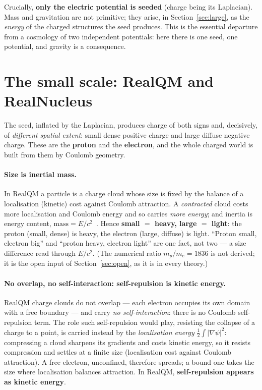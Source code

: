\documentclass[11pt]{article}
\newcommand{\grad}{\nabla}
\newcommand{\half}{\tfrac{1}{2}}
\begin{document}
Crucially, \textbf{only the electric potential is seeded} (charge being its Laplacian). Mass and gravitation are not primitive; they arise, in
Section~\ref{sec:large}, as the \emph{energy} of the charged structures the seed produces. This is the essential
departure from a cosmology of two independent potentials: here there is one seed, one potential, and gravity is a
consequence.

\section{The small scale: RealQM and RealNucleus}\label{sec:small}
The seed, inflated by the Laplacian, produces charge of both signs and, decisively, of \emph{different spatial extent}: small dense
positive charge and large diffuse negative charge. These are the \textbf{proton} and the \textbf{electron}, and
the whole charged world is built from them by Coulomb geometry.

\paragraph{Size is inertial mass.} In RealQM a particle is a charge cloud whose size is fixed by the balance of a
localisation (kinetic) cost against Coulomb attraction. A \emph{contracted} cloud costs more localisation and
Coulomb energy and so carries \emph{more energy}; and inertia is energy content, $\text{mass}=E/c^2$~\cite{nomass}.
Hence \textbf{small $=$ heavy, large $=$ light}: the proton (small, dense) is heavy, the electron (large, diffuse)
is light. ``Proton small, electron big'' and ``proton heavy, electron light'' are one fact, not two --- a size
difference read through $E/c^2$. (The numerical ratio $m_p/m_e=1836$ is not derived; it is the open input of
Section~\ref{sec:open}, as it is in every theory.)

\paragraph{No overlap, no self-interaction: self-repulsion is kinetic energy.} RealQM charge clouds do not overlap
--- each electron occupies its own domain with a free boundary --- and carry \emph{no self-interaction}: there is
no Coulomb self-repulsion term. The role such self-repulsion would play, resisting the collapse of a charge to a
point, is carried instead by the \emph{localisation energy} $\half\int|\grad\psi|^2$: compressing a cloud sharpens
its gradients and costs kinetic energy, so it resists compression and settles at a finite size (localisation cost
against Coulomb attraction). A free electron, unconfined, therefore spreads; a bound one takes the size where
localisation balances attraction. In RealQM, \textbf{self-repulsion appears as kinetic energy}.
\end{document}
